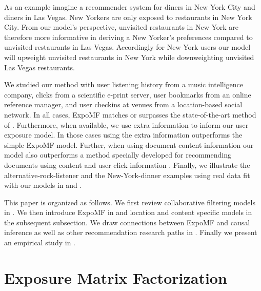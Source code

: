 As an example imagine a recommender system for diners in New York City and
diners in Las Vegas. New Yorkers are only exposed to restaurants in New York City.
From our model's perspective, unvisited restaurants in New York are therefore more 
informative in deriving a New Yorker's preferences compared to unvisited 
restaurants in Las Vegas. Accordingly for New York users our model will
upweight unvisited restaurants in New York while downweighting unvisited
Las Vegas restaurants. 

We studied our method with user listening history from a music intelligence company, clicks from a scientific e-print server, user
bookmarks from an online reference manager, and user checkins at venues from a 
location-based social network. In all cases, ExpoMF matches or surpasses
the state-of-the-art method of \citet{hu2008collaborative}. Furthermore, when
available, we use extra information to inform our user exposure model. In those
cases using the extra information outperforms the simple ExpoMF model.
Further, when using document content information our model also
outperforms a method specially developed for recommending documents using content and user click information 
\cite{wang2011collaborative}. Finally, we illustrate the
alternative-rock-listener and the New-York-dinner examples using real data fit 
with our models in  and . 




This paper is organized as follows. We first review collaborative filtering models in . We
then introduce ExpoMF in  and location and content
specific models in the subsequent subsection. We draw connections between ExpoMF and causal inference as well as other recommendation research paths in
. Finally we present an empirical study in
.




\section{Exposure Matrix Factorization}\label{sec:model}

